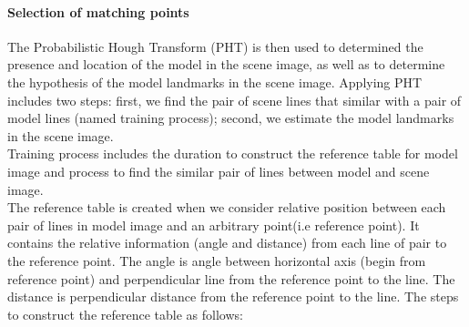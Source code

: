 \documentclass[twoside,twocolumn,10pt]{article}
\begin{document}
\paragraph{Selection of matching points}
The Probabilistic Hough Transform (PHT) is then used to determined the presence and location of the
model in the scene image, as well as to determine the hypothesis of
the model landmarks in the scene
image\cite{ashbrook1995robust}. Applying PHT includes two steps:
first, we find the pair of scene lines that similar with a pair of
model lines (named training process); second, we estimate the model landmarks in the scene image.\\[0.2cm]
Training process includes the duration to construct the reference table for model image and process to find the similar pair of lines between model and scene image.\\
The reference table is created when we consider relative position between each pair of lines in model image and an arbitrary point(i.e reference point). It contains the relative information (angle and distance) from each line of pair to the reference point. The angle is angle between horizontal axis (begin from reference point) and perpendicular line from the reference point to the line. The distance is perpendicular distance from the reference point to the line. The steps to construct the reference table as follows:
\end{document}
